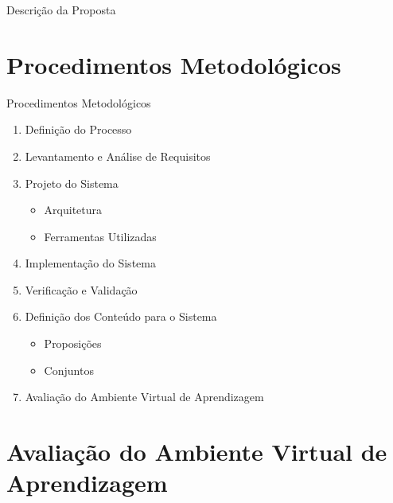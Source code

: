\documentclass[aspectratio=169]{beamer}
\begin{document}
\begin{frame}{Descrição da Proposta}
\begin{overprint}
\end{overprint}

\end{frame}

\section{Procedimentos Metodológicos}

\begin{frame}{Procedimentos Metodológicos}
	\begin{enumerate}
    	\item Definição do Processo
    	\pause
        \item Levantamento e Análise de Requisitos
		\pause        
        \item Projeto do Sistema
        \pause
        \begin{itemize}
        	\item Arquitetura
        	\pause
        	\item Ferramentas Utilizadas
        	\pause
        \end{itemize}
        \item Implementação do Sistema
        \pause
        \item Verificação e Validação
        \pause
        \item Definição dos Conteúdo para o Sistema
        	\begin{itemize}
        		\item Proposições
        		\item Conjuntos
        	\end{itemize}
        \pause
        \item Avaliação do Ambiente Virtual de Aprendizagem
    \end{enumerate}
\end{frame}


\section{Avaliação do Ambiente Virtual de Aprendizagem}
\end{document}
